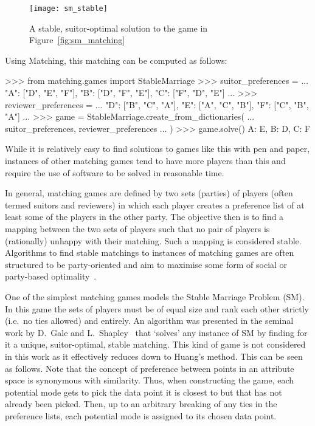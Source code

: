 \begin{figure}
    \centering
    \texttt{[image: sm\_stable]}
    \caption{%
        A stable, suitor-optimal solution to the game in
        Figure~\ref{fig:sm_matching}
    }\label{fig:sm_stable}
\end{figure}

Using Matching, this matching can be computed as follows:

\begin{usagepy}
>>> from matching.games import StableMarriage
>>> suitor_preferences = {
...     "A": ["D", "E", "F"], "B": ["D", "F", "E"], "C": ["F", "D", "E"]
... }
>>> reviewer_preferences = {
...     "D": ["B", "C", "A"], "E": ["A", "C", "B"], "F": ["C", "B", "A"]
... }
>>> game = StableMarriage.create_from_dictionaries(
...     suitor_preferences, reviewer_preferences
... )
>>> game.solve()
{A: E, B: D, C: F}

\end{usagepy}

While it is relatively easy to find solutions to games like this with pen and
paper, instances of other matching games tend to have more players than this and
require the use of software to be solved in reasonable time.

In general, matching games are defined by two sets (parties) of players (often
termed suitors and reviewers) in which each player creates a preference list of
at least some of the players in the other party. The objective then is to find a
mapping between the two sets of players such that no pair of players is
(rationally) unhappy with their matching. Such a mapping is considered stable.
Algorithms to find stable matchings to instances of matching games are often
structured to be party-oriented and aim to maximise some form of social or
party-based optimality~\cite{Fuku2006,Gale1962,Kwanashie2015}.

One of the simplest matching games models the Stable Marriage Problem (SM). In
this game the sets of players must be of equal size and rank each other strictly
(i.e.\ no ties allowed) and entirely. An algorithm was presented in the seminal
work by D.\ Gale and L.\ Shapley~\cite{Gale1962} that `solves' any instance of
SM by finding for it a unique, suitor-optimal, stable matching. This kind of
game is not considered in this work as it effectively reduces down to Huang's
method. This can be seen as follows. Note that the concept of preference between
points in an attribute space is synonymous with similarity. Thus, when
constructing the game, each potential mode gets to pick the data point it is
closest to but that has not already been picked. Then, up to an arbitrary
breaking of any ties in the preference lists, each potential mode is assigned to
its chosen data point.

